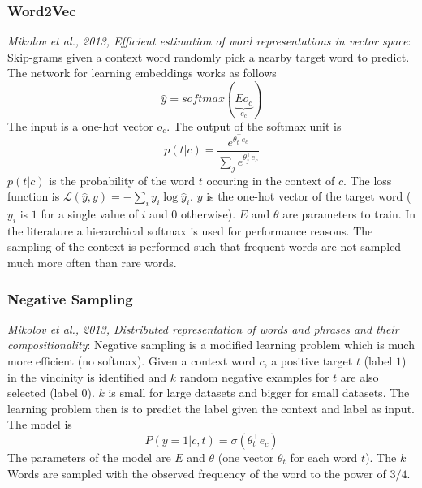 \documentclass{article}
\begin{document}
\subsubsection{Word2Vec}
\emph{Mikolov et al., 2013, Efficient estimation of word representations in vector space}:
Skip-grams given a context word randomly pick a nearby target word to predict.
The network for learning embeddings works as follows
\begin{equation}
  \hat{y}=softmax(\underbrace{Eo_c}_{e_c})
\end{equation}
The input is a one-hot vector $o_c$.
The output of the softmax unit is
\begin{equation}
  p(t|c)=\frac{e^{\theta_t^\top e_c}}{\sum_je^{\theta_j^\top e_c}}
\end{equation}
$p(t|c)$ is the probability of the word $t$ occuring in the context of $c$.
The loss function is $\mathcal{L}(\hat{y},y)=-\sum_iy_i\log\hat{y}_i$.
$y$ is the one-hot vector of the target word ($y_i$ is $1$ for a single value of $i$ and $0$ otherwise).
$E$ and $\theta$ are parameters to train.
In the literature a hierarchical softmax is used for performance reasons.
The sampling of the context is performed such that frequent words are not sampled much more often than rare words.

\subsubsection{Negative Sampling}
\emph{Mikolov et al., 2013, Distributed representation of words and phrases and their compositionality}:
Negative sampling is a modified learning problem which is much more efficient (no softmax).
Given a context word $c$, a positive target $t$ (label $1$) in the vincinity is identified
and $k$ random negative examples for $t$ are also selected (label $0$).
$k$ is small for large datasets and bigger for small datasets.
The learning problem then is to predict the label given the context and label as input.
The model is
\begin{equation}
  P(y=1|c,t)=\sigma(\theta_t^\top e_c)
\end{equation}
The parameters of the model are $E$ and $\theta$ (one vector $\theta_t$ for each word $t$).
The $k$ Words are sampled with the observed frequency of the word to the power of $3/4$.
\end{document}
